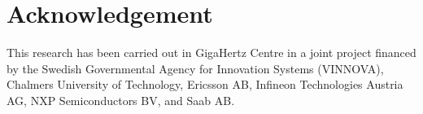 \documentclass[journal]{IEEEtran}
\begin{document}
\section*{Acknowledgement}
This research has been carried out in GigaHertz Centre in a joint project financed by the Swedish Governmental Agency
for Innovation Systems (VINNOVA), Chalmers University of Technology, Ericsson AB, Infineon Technologies Austria AG, NXP Semiconductors BV, and Saab AB.


\ifCLASSOPTIONcaptionsoff
  \newpage
\fi

























\end{document}
